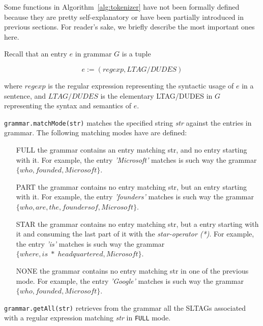 Some functions in Algorithm~\ref{alg:tokenizer} have not been formally defined because they are pretty self-explanatory or have been partially introduced in previous sections.
For reader's sake, we briefly describe the most important ones here. 

Recall that an entry $e$ in grammar $G$ is a tuple

\begin{equation}
\label{eqn:grammar-entry}
e:=(regexp,LTAG/DUDES)
\end{equation}

where
$regexp$ is the regular expression representing the syntactic usage of $e$ in a sentence, and
$LTAG/DUDES$ is the elementary LTAG/DUDES in $G$ representing the syntax and semantics of $e$.

\texttt{grammar.matchMode(str)} matches the specified string \textit{str} against the entries in grammar. 
%
The following matching modes have are defined:
%
\begin{itemize}
	\item[FULL] the grammar contains an entry matching str, and no entry starting with it. 
	For example, the entry \textit{'Microsoft'} matches is such way the grammar $\{who,founded,Microsoft\}$.
	
	\item[PART] the grammar contains no entry matching str, but an entry starting with it.
	For example, the entry \textit{'founders'} matches is such way the grammar $\{who,are,the,founders of,Microsoft\}$.
	
	\item[STAR] the grammar contains no entry matching str, but a entry starting with it and consuming the last part of it with the \textit{star-operator (*)}.
	For example, the entry \textit{'is'} matches is such way the grammar $\{where,is\;*\;headquartered,Microsoft\}$.

	\item[NONE] the grammar contains no entry matching str in one of the previous mode.
	For example, the entry \textit{'Google'} matches is such way the grammar $\{who,founded,Microsoft\}$.
\end{itemize}

\texttt{grammar.getAll(str)} retrieves from the grammar all the SLTAGs associated with a regular expression matching \textit{str} in \texttt{FULL} mode.